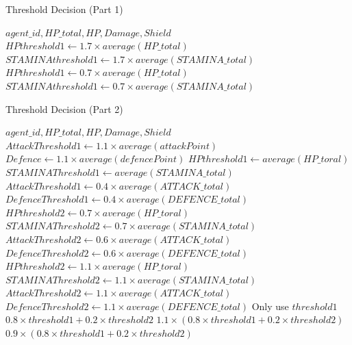 \clearpage






\clearpage

\begin{algorithm}
\caption{Threshold Decision (Part 1)}
\begin{algorithmic} 
\Require $agent\_id, HP\_total, HP, Damage, Shield$
\State $HPthreshold1 \leftarrow 1.7 \times average(HP\_total)$
\EndIf
{}
\State $STAMINAthreshold1 \leftarrow 1.7 \times average(STAMINA\_total)$
\EndIf
{}
\State $HPthreshold1 \leftarrow 0.7 \times average(HP\_total)$
\EndIf
{}
\State $STAMINAthreshold1 \leftarrow 0.7 \times average(STAMINA\_total)$
\EndIf
\end{algorithmic}
\end{algorithm}

\begin{algorithm}
\caption{Threshold Decision (Part 2)}
\begin{algorithmic} 
\Require $agent\_id, HP\_total, HP, Damage, Shield$
\State $AttackThreshold1 \leftarrow 1.1 \times average(attackPoint)$
\State $Defence \leftarrow 1.1 \times average(defencePoint)$
\EndIf
{}
\State $HPthreshold1 \leftarrow average(HP\_toral)$
\State $STAMINAThreshold1 \leftarrow average(STAMINA\_total)$
\State $AttackThreshold1 \leftarrow 0.4 \times average(ATTACK\_total)$
\State $DefenceThreshold1 \leftarrow 0.4 \times average(DEFENCE\_total)$
\EndIf
{}
\State $HPthreshold2 \leftarrow 0.7 \times average(HP\_toral)$
\State $STAMINAThreshold2 \leftarrow 0.7 \times average(STAMINA\_total)$
\State $AttackThreshold2 \leftarrow 0.6 \times average(ATTACK\_total)$
\State $DefenceThreshold2 \leftarrow 0.6 \times average(DEFENCE\_total)$
\EndIf
{}
\State $HPthreshold2 \leftarrow 1.1 \times average(HP\_toral)$
\State $STAMINAThreshold2 \leftarrow 1.1 \times average(STAMINA\_total)$
\State $AttackThreshold2 \leftarrow 1.1 \times average(ATTACK\_total)$
\State $DefenceThreshold2 \leftarrow 1.1 \times average(DEFENCE\_total)$
\EndIf
{}
\State Only use $threshold1$
\EndIf
{}
\State $0.8\times threshold1 + 0.2 \times threshold2$
\EndIf
{}
\State $1.1 \times (0.8\times threshold1 + 0.2 \times threshold2)$
\EndIf
{}
\State $0.9 \times (0.8\times threshold1 + 0.2 \times threshold2)$
\EndIf
\end{algorithmic}
\end{algorithm}


